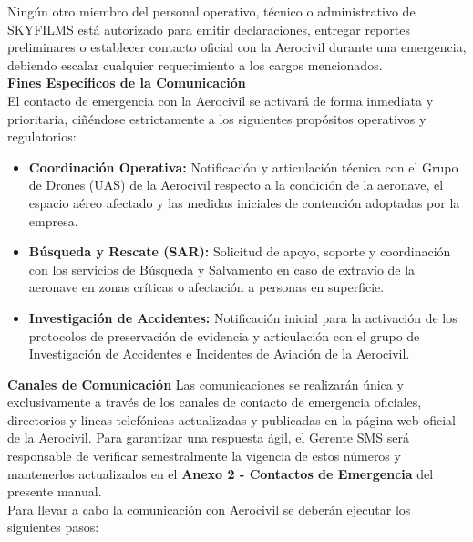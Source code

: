 Ningún otro miembro del personal operativo, técnico o administrativo de SKYFILMS está autorizado para emitir declaraciones, entregar reportes preliminares o establecer contacto oficial con la Aerocivil durante una emergencia, debiendo escalar cualquier requerimiento a los cargos mencionados.\\

\textbf{Fines Específicos de la Comunicación}\\

El contacto de emergencia con la Aerocivil se activará de forma inmediata y prioritaria, ciñéndose estrictamente a los siguientes propósitos operativos y regulatorios:

\begin{itemize}
    \item \textbf{Coordinación Operativa:} Notificación y articulación técnica con el Grupo de Drones (UAS) de la Aerocivil respecto a la condición de la aeronave, el espacio aéreo afectado y las medidas iniciales de contención adoptadas por la empresa.

    \item \textbf{Búsqueda y Rescate (SAR):} Solicitud de apoyo, soporte y coordinación con los servicios de Búsqueda y Salvamento en caso de extravío de la aeronave en zonas críticas o afectación a personas en superficie.

    \item \textbf{Investigación de Accidentes:} Notificación inicial para la activación de los protocolos de preservación de evidencia y articulación con el grupo de Investigación de Accidentes e Incidentes de Aviación de la Aerocivil.
\end{itemize}


\textbf{Canales de Comunicación}
Las comunicaciones se realizarán única y exclusivamente a través de los canales de contacto de emergencia oficiales, directorios y líneas telefónicas actualizadas y publicadas en la página web oficial de la Aerocivil. Para garantizar una respuesta ágil, el Gerente SMS será responsable de verificar semestralmente la vigencia de estos números y mantenerlos actualizados en el \textbf{Anexo 2 - Contactos de Emergencia} del presente manual.\\

Para llevar a cabo la comunicación con Aerocivil se deberán ejecutar los siguientes pasos: 



